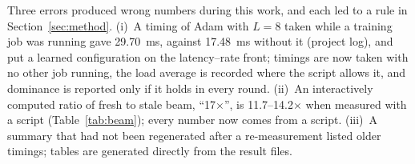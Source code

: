 Three errors produced wrong numbers during this work, and each led to a rule in Section~\ref{sec:method}. (i)~A timing of Adam with $L=8$ taken while a training job was running gave 29.70~ms, against 17.48~ms without it (project log), and put a learned configuration on the latency--rate front; timings are now taken with no other job running, the load average is recorded where the script allows it, and dominance is reported only if it holds in every round. (ii)~An interactively computed ratio of fresh to stale beam, ``17$\times$'', is 11.7--14.2$\times$ when measured with a script (Table~\ref{tab:beam}); every number now comes from a script. (iii)~A summary that had not been regenerated after a re-measurement listed older timings; tables are generated directly from the result files.
